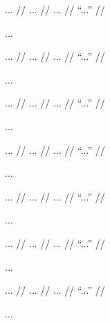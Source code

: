\documentclass[12pt,paper=a4]{scrartcl}
\begin{document}
\ex \begingl
	\glpreamble ... //
	\gla ... //
	\glb ... //
	\glft \enquote{...} //
\endgl \xe

...


\ex \begingl
	\glpreamble ... //
	\gla ... //
	\glb ... //
	\glft \enquote{...} //
\endgl \xe

...


\ex \begingl
	\glpreamble ... //
	\gla ... //
	\glb ... //
	\glft \enquote{...} //
\endgl \xe

...


\ex \begingl
	\glpreamble ... //
	\gla ... //
	\glb ... //
	\glft \enquote{...} //
\endgl \xe

...


\ex \begingl
	\glpreamble ... //
	\gla ... //
	\glb ... //
	\glft \enquote{...} //
\endgl \xe

...


\ex \begingl
	\glpreamble ... //
	\gla ... //
	\glb ... //
	\glft \enquote{...} //
\endgl \xe

...


\ex \begingl
	\glpreamble ... //
	\gla ... //
	\glb ... //
	\glft \enquote{...} //
\endgl \xe

...

\end{document}
